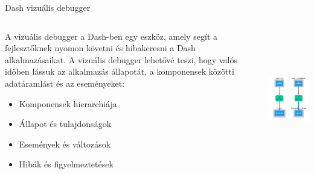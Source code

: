 \documentclass[english, aspectratio=169]{beamer}
\begin{document}
\begin{frame}{Dash vizuális debugger}
	\begin{columns}
		\begin{column}{.5\textwidth}
			A vizuális debugger a Dash-ben egy eszköz, amely segít a fejlesztőknek nyomon követni és hibakeresni a Dash alkalmazásaikat. A vizuális debugger lehetővé teszi, hogy valós időben lássuk az alkalmazás állapotát, a komponensek közötti adatáramlást és az eseményeket:
			\begin{itemize}
				\item Komponensek hierarchiája
				\item Állapot és tulajdonságok
				\item Események és változások
				\item Hibák és figyelmeztetések
			\end{itemize}
		\end{column}
		\begin{column}{.5\textwidth}
			\begin{center}
				\includegraphics[width=7cm, height=6cm, keepaspectratio]{images/plots_6.png}
			\end{center}
		\end{column}
	\end{columns}
\end{frame}
\end{document}
